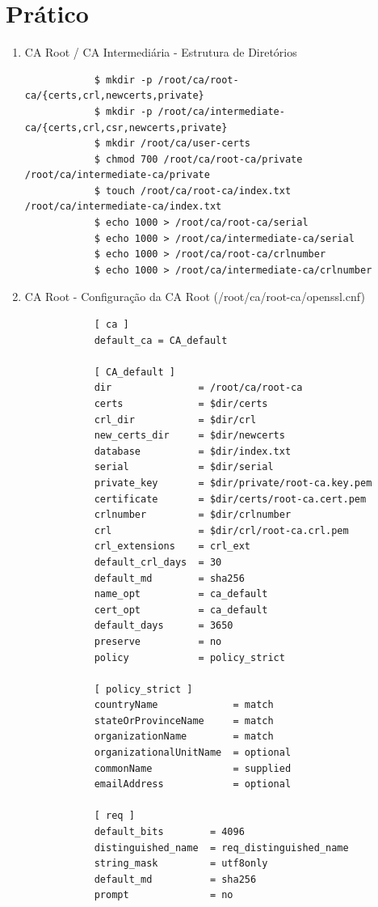 \section{Prático}

\begin{enumerate}
	\item CA Root / CA Intermediária - Estrutura de Diretórios
	\begin{tcolorbox}[width=\textwidth]
	{\footnotesize
		\begin{verbatim}
			$ mkdir -p /root/ca/root-ca/{certs,crl,newcerts,private}
			$ mkdir -p /root/ca/intermediate-ca/{certs,crl,csr,newcerts,private}
			$ mkdir /root/ca/user-certs
			$ chmod 700 /root/ca/root-ca/private /root/ca/intermediate-ca/private
			$ touch /root/ca/root-ca/index.txt /root/ca/intermediate-ca/index.txt
			$ echo 1000 > /root/ca/root-ca/serial
			$ echo 1000 > /root/ca/intermediate-ca/serial
			$ echo 1000 > /root/ca/root-ca/crlnumber
			$ echo 1000 > /root/ca/intermediate-ca/crlnumber
		\end{verbatim}
	}
	\end{tcolorbox}

	\item CA Root - Configuração da CA Root (/root/ca/root-ca/openssl.cnf)
	\begin{tcolorbox}[width=\textwidth, enhanced, breakable]
	{\footnotesize
		\begin{verbatim}
			[ ca ]
			default_ca = CA_default
			
			[ CA_default ]
			dir               = /root/ca/root-ca
			certs             = $dir/certs
			crl_dir           = $dir/crl
			new_certs_dir     = $dir/newcerts
			database          = $dir/index.txt
			serial            = $dir/serial
			private_key       = $dir/private/root-ca.key.pem
			certificate       = $dir/certs/root-ca.cert.pem
			crlnumber         = $dir/crlnumber
			crl               = $dir/crl/root-ca.crl.pem
			crl_extensions    = crl_ext
			default_crl_days  = 30
			default_md        = sha256
			name_opt          = ca_default
			cert_opt          = ca_default
			default_days      = 3650
			preserve          = no
			policy            = policy_strict
			
			[ policy_strict ]
			countryName             = match
			stateOrProvinceName     = match
			organizationName        = match
			organizationalUnitName  = optional
			commonName              = supplied
			emailAddress            = optional
			
			[ req ]
			default_bits        = 4096
			distinguished_name  = req_distinguished_name
			string_mask         = utf8only
			default_md          = sha256
			prompt              = no
			

\end{verbatim}}
\end{tcolorbox}
\end{enumerate}
